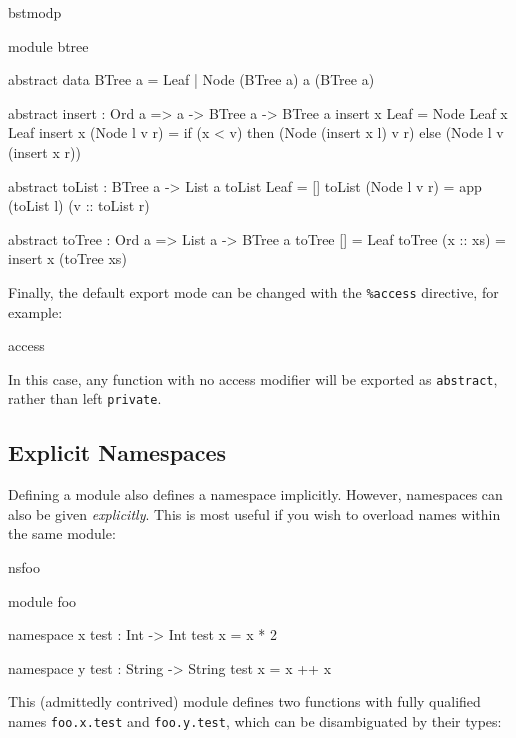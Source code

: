 \begin{SaveVerbatim}{bstmodp}

module btree

abstract data BTree a = Leaf
                      | Node (BTree a) a (BTree a)

abstract
insert : Ord a => a -> BTree a -> BTree a
insert x Leaf = Node Leaf x Leaf
insert x (Node l v r) = if (x < v) then (Node (insert x l) v r)
                                   else (Node l v (insert x r))

abstract
toList : BTree a -> List a
toList Leaf = []
toList (Node l v r) = app (toList l) (v :: toList r)

abstract
toTree : Ord a => List a -> BTree a
toTree [] = Leaf
toTree (x :: xs) = insert x (toTree xs)

\end{SaveVerbatim}

\noindent
Finally, the default export mode can be changed with the \texttt{\%access} directive,
for example:

\begin{SaveVerbatim}{access}


\end{SaveVerbatim}

\noindent
In this case, any function with no access modifier will be exported as \texttt{abstract},
rather than left \texttt{private}.

\subsection{Explicit Namespaces}

Defining a module also defines a namespace implicitly. However, namespaces can also
be given \emph{explicitly}. This is most useful if you wish to overload names within
the same module:

\begin{SaveVerbatim}{nsfoo}

module foo

namespace x
  test : Int -> Int
  test x = x * 2

namespace y
  test : String -> String
  test x = x ++ x 

\end{SaveVerbatim}

\noindent
This (admittedly contrived) module defines two functions with fully qualified names
\texttt{foo.x.test} and \texttt{foo.y.test}, which can be disambiguated by their
types:

